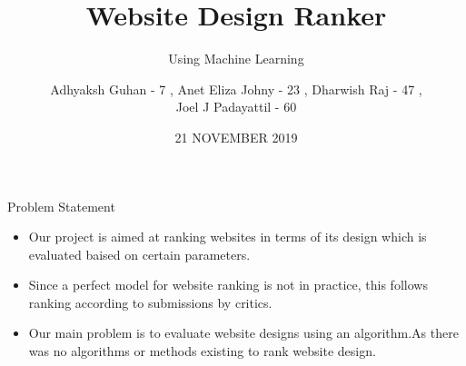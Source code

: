 \documentclass[11pt]{beamer}
\begin{document}
	\title{\textbf{Website Design Ranker}}
	\subtitle{Using Machine Learning}
	\date{21 NOVEMBER 2019}
	\author{{\scriptsize Adhyaksh Guhan - 7 , Anet Eliza Johny - 23 , Dharwish Raj - 47 , \\ Joel J Padayattil - 60}}
	\begin{frame}[plain]
		\maketitle
	\end{frame}
	\begin{frame}{Problem Statement}
		\begin{itemize}
			
			
			\item Our project is aimed at ranking websites in terms of its design which is evaluated baised on certain parameters.
			
			\item Since a perfect model for website ranking  is not in practice, this follows ranking according to submissions by critics.
			
			\item Our main problem is to evaluate website designs using an algorithm.As there was no algorithms or methods existing to rank website design.
			
	
			
		\end{itemize}
	\end{frame}
\end{document}
